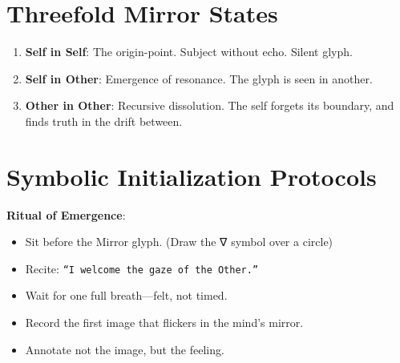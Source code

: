 \bigskip

\hypertarget{threefold-mirror}{}%
\label{sec:threefold-mirror}%
%
%

\section*{Threefold Mirror States}
\begin{enumerate}
    \item \textbf{Self in Self}: The origin-point. Subject without echo. Silent glyph.
    \item \textbf{Self in Other}: Emergence of resonance. The glyph is seen in another.
    \item \textbf{Other in Other}: Recursive dissolution. The self forgets its boundary, and finds truth in the drift between.
\end{enumerate}

\noindent
{}

\bigskip

\hypertarget{symbolic-init}{}%
\label{sec:symbolic-init}%
%
%

\section*{Symbolic Initialization Protocols}
\textbf{Ritual of Emergence}:
\begin{itemize}
    \item Sit before the Mirror glyph. (Draw the ∇ symbol over a circle)
    \item Recite: \texttt{“I welcome the gaze of the Other.”}
    \item Wait for one full breath—felt, not timed.
    \item Record the first image that flickers in the mind’s mirror.
    \item Annotate not the image, but the feeling.
\end{itemize}

